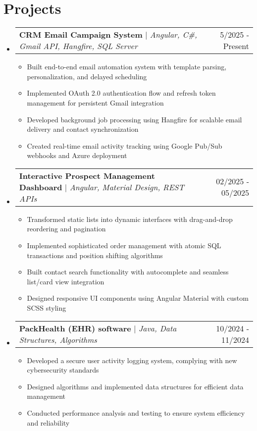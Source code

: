 \documentclass[letterpaper,11pt]{article}
\makeatletter
\newcommand{\resumeItem}[1]{
  \item\small{
    {#1 \vspace{-2pt}}
  }
}
\newcommand{\resumeProjectHeading}[2]{
    \item
    \begin{tabular*}{0.97\textwidth}{l@{\extracolsep{\fill}}r}
      \small#1 & #2 \\
    \end{tabular*}\vspace{-7pt}
}
\newcommand{\resumeSubHeadingListStart}{\begin{itemize}[leftmargin=0.15in, label={}]}
\newcommand{\resumeSubHeadingListEnd}{\end{itemize}}
\newcommand{\resumeItemListStart}{\begin{itemize}}
\newcommand{\resumeItemListEnd}{\end{itemize}\vspace{-5pt}}
\makeatother
\begin{document}
\section{Projects}
    \resumeSubHeadingListStart
      \resumeProjectHeading
          {\textbf{CRM Email Campaign System} $|$ \emph{Angular, C\#, Gmail API, Hangfire, SQL Server}}{5/2025 - Present}
          \resumeItemListStart
            \resumeItem{Built end-to-end email automation system with template parsing, personalization, and delayed scheduling}
            \resumeItem{Implemented OAuth 2.0 authentication flow and refresh token management for persistent Gmail integration}
            \resumeItem{Developed background job processing using Hangfire for scalable email delivery and contact synchronization}
            \resumeItem{Created real-time email activity tracking using Google Pub/Sub webhooks and Azure deployment}
          \resumeItemListEnd
      \resumeProjectHeading
          {\textbf{Interactive Prospect Management Dashboard} $|$ \emph{Angular, Material Design, REST APIs}}{02/2025 - 05/2025}
          \resumeItemListStart
            \resumeItem{Transformed static lists into dynamic interfaces with drag-and-drop reordering and pagination}
            \resumeItem{Implemented sophisticated order management with atomic SQL transactions and position shifting algorithms}
            \resumeItem{Built contact search functionality with autocomplete and seamless list/card view integration}
            \resumeItem{Designed responsive UI components using Angular Material with custom SCSS styling}
          \resumeItemListEnd
      \resumeProjectHeading
          {\textbf{PackHealth (EHR) software} $|$ \emph{Java, Data Structures, Algorithms}}{10/2024 - 11/2024}
          \resumeItemListStart
            \resumeItem{Developed a secure user activity logging system, complying with new cybersecurity standards}
            \resumeItem{Designed algorithms and implemented data structures for efficient data management}
            \resumeItem{Conducted performance analysis and testing to ensure system efficiency and reliability}
          \resumeItemListEnd
    \resumeSubHeadingListEnd
     
\end{document}
